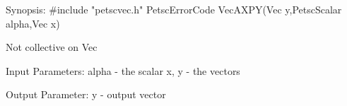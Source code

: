 Synopsis:
#include "petscvec.h"
PetscErrorCode  VecAXPY(Vec y,PetscScalar alpha,Vec x)

Not collective on Vec

Input Parameters:
alpha - the scalar
x, y  - the vectors 

Output Parameter:
y - output vector 
